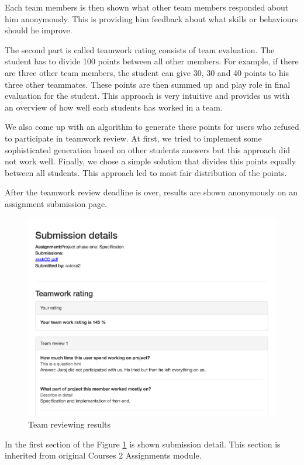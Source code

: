 Each team members is then shown what other team members responded about him anonymously. This is providing him feedback about what skills or behaviours should he improve.

The second part is called teamwork rating consists of team evaluation. The student has to divide 100 points between all other members. For example, if there are three other team members, the student can give 30, 30 and 40 points to his three other teammates. These points are then summed up and play role in final evaluation for the student. This approach is very intuitive and provides us with an overview of how well each students has worked in a team.

We also come up with an algorithm to generate these points for users who refused to participate in teamwork review. At first, we tried to implement some sophisticated generation based on other students answers but this approach did not work well. Finally, we chose a simple solution that divides this points equally between all students. This approach led to most  fair distribution of the points.

After the teamwork review deadline is over, results are shown anonymously on an assignment submission page. 

\begin{figure}[h]
    \centering
    \includegraphics[width=\textwidth]{images/teamreview.png}
    \caption{Team reviewing results}
    \label{team_reviewing}
\end{figure}

In the first section of the Figure \ref{team_reviewing} is shown submission detail. This section is inherited from original Courses 2 Assignments module.

